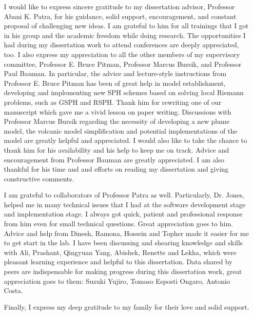I would like to express sincere gratitude to my dissertation advisor, Professor Abani K. Patra, for his guidance, solid support, encouragement, and constant proposal of challenging new ideas. I am grateful to him for all trainings that I got in his group and the academic freedom while doing research. The opportunities I had during my dissertation work to attend conferences are deeply appreciated, too.
I also express my appreciation to all the other members of my supervisory committee, Professor E. Bruce Pitman, Professor Marcus Bursik, and Professor Paul Bauman. In particular, the advice
and lecture-style instructions from Professor E. Bruce Pitman has been of great help in model establishment, developing and implementing new SPH schemes based on solving local Riemann problems, such as GSPH and RSPH. Thank him for rewriting one of our manuscript which gave me a vivid lesson on paper writing. Discussions with Professor Marcus Bursik regarding the necessity of developing a new plume model, the volcanic model simplification and potential implementations of the model are greatly helpful and appreciated. I would also like to take the chance to thank him for his availability and his help to keep me on track. Advice and encouragement from Professor Bauman are greatly appreciated. I am also thankful for his time and and efforts on reading my dissertation and giving constructive comments. 

I am grateful to collaborators of Professor Patra as well. Particularly, Dr. Jones, helped me in many technical issues that I had at the software development stage and implementation stage. I always got quick, patient and professional response from him even for small technical questions. Great appreciation goes to him. Advice and help from Dinesh, Ramona, Hossein and Topher made it easier for me to get start in the lab. I have been discussing and shearing knowledge and skills with Ali, Prashant, Qingyuan Yang, Abishek, Renette and Lekha, which were pleasant learning experience and helpful to this dissertation. Data shared by peers are indispensable for making progress during this dissertation work, great appreciation goes to them: Suzuki Yujiro, Tomaso Esposti Ongaro, Antonio Costa.
 
Finally, I express my deep gratitude to my family for their love and solid support.